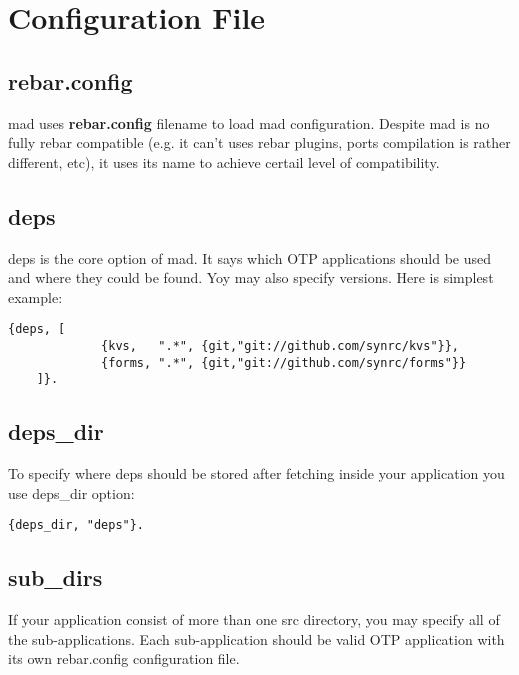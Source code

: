 \section{Configuration File}

\subsection{rebar.config}

mad uses {\bf rebar.config} filename to load mad configuration.
Despite mad is no fully rebar compatible (e.g. it can't uses
rebar plugins, ports compilation is rather different, etc),
it uses its name to achieve certail level of compatibility.

\subsection{deps}

deps is the core option of mad. It says which OTP applications
should be used and where they could be found. Yoy may also specify
versions. Here is simplest example:

\vspace{1\baselineskip}
\begin{lstlisting}[caption=deps Option]
    {deps, [
             {kvs,   ".*", {git,"git://github.com/synrc/kvs"}},
             {forms, ".*", {git,"git://github.com/synrc/forms"}}
    ]}.
\end{lstlisting}
\vspace{1\baselineskip}

\subsection{deps\_dir}

To specify where deps should be stored after fetching inside
your application you use deps\_dir option:

\vspace{1\baselineskip}
\begin{lstlisting}[caption=deps\_dir Option]
    {deps_dir, "deps"}.
\end{lstlisting}
\vspace{1\baselineskip}

\subsection{sub\_dirs}

If your application consist of more than one src
directory, you may specify all of the sub-applications.
Each sub-application should be valid OTP application
with its own rebar.config configuration file.

